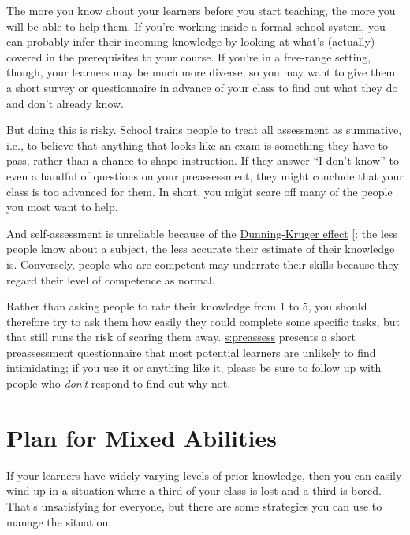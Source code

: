 The more you know about your learners before you start teaching, the
more you will be able to help them. If you're working inside a formal
school system, you can probably infer their incoming knowledge by
looking at what's (actually) covered in the prerequisites to your
course. If you're in a free-range setting, though, your learners may be
much more diverse, so you may want to give them a short survey or
questionnaire in advance of your class to find out what they do and
don't already know.

But doing this is risky. School trains people to treat all assessment as
summative, i.e., to believe that anything that looks like an exam is
something they have to pass, rather than a chance to shape instruction.
If they answer ``I don't know'' to even a handful of questions on your
preassessment, they might conclude that your class is too advanced for
them. In short, you might scare off many of the people you most want to
help.

And self-assessment is unreliable because of the \href{https://en.wikipedia.org/wiki/Dunning\%E2\%80\%93Kruger_effect}{Dunning-Kruger
effect} {[}\protect[\hyperlink{b:Krug1999}{Krug1999}]{]}: the less people know
about a subject, the less accurate their estimate of their knowledge
is. Conversely, people who are competent may underrate their skills
because they regard their level of competence as normal.

Rather than asking people to rate their knowledge from 1 to 5, you
should therefore try to ask them how easily they could complete some
specific tasks, but that still runs the risk of scaring them away.
\protect\hyperlink{APPENDIX}{s:preassess} presents a short preassessment questionnaire
that most potential learners are unlikely to find intimidating; if you
use it or anything like it, please be sure to follow up with people who
\emph{don't} respond to find out why not.

\section{Plan for Mixed Abilities}\label{s:classroom-mixed}

If your learners have widely varying levels of prior knowledge, then you
can easily wind up in a situation where a third of your class is lost
and a third is bored. That's unsatisfying for everyone, but there are
some strategies you can use to manage the situation:

